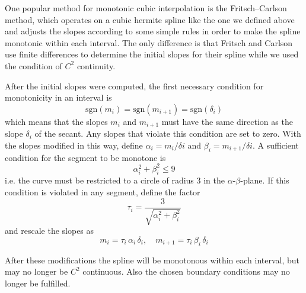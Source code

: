 One popular method for monotonic cubic interpolation is the Fritsch–Carlson method\cite{bib:fc80}, which operates on a cubic hermite spline like the one we defined above and adjusts the slopes according to some simple rules in order to make the spline monotonic within each interval.
The only difference is that Fritsch and Carlson use finite differences to determine the initial slopes for their spline while we used the condition of $C^2$ continuity.

After the initial slopes were computed, the first necessary condition for monotonicity in an interval is
%
\begin{equation}
\mathrm{sgn}(m_{i}) = \mathrm{sgn}(m_{i+1}) = \mathrm{sgn}(\delta_{i})
\end{equation}
%
which means that the slopes $m_{i}$ and $m_{i+1}$ must have the same direction as the slope $\delta_{i}$ of the secant.
Any slopes that violate this condition are set to zero.
With the slopes modified in this way, define $\alpha_{i} = m_{i}/\delta{i}$ and $\beta_{i} = m_{i+1}/\delta{i}$.
A sufficient condition for the segment to be monotone is
%
\begin{equation}
\alpha_{i}^2 + \beta_{i}^2 \le 9
\end{equation}
%
i.e. the curve must be restricted to a circle of radius $3$ in the $\alpha$-$\beta$-plane.
If this condition is violated in any segment, define the factor
%
\begin{equation}
\tau_{i} = \frac{3}{\sqrt{\alpha_{i}^2 + \beta_{i}^2}}
\end{equation}
%
and rescale the slopes as
%
\begin{equation}
m_{i} = \tau_{i}\,\alpha_{i}\,\delta_{i},\quad m_{i+1} = \tau_{i}\,\beta_{i}\,\delta_{i}
\end{equation}

After these modifications the spline will be monotonous within each interval, but may no longer be $C^2$ continuous.
Also the chosen boundary conditions may no longer be fulfilled.